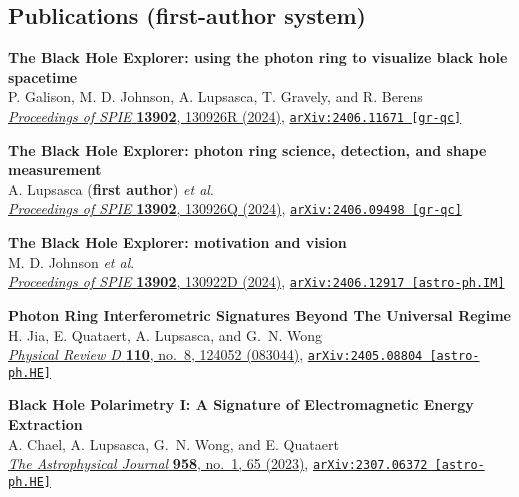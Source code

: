 \documentclass[margin,line]{resume}
\begin{document}
\begin{resume}

\clearpage

\section{\mysidestyle Publications (first-author system)}

\textbf{The Black Hole Explorer: using the photon ring to visualize black hole spacetime} \\
P. Galison, M. D. Johnson, A. Lupsasca, T. Gravely, and R. Berens \\
\href{https://doi.org/10.1117/12.3019994}{\textit{Proceedings of SPIE} \textbf{13902}, 130926R (2024)}, \texttt{\href{https://arxiv.org/abs/2406.11671}{arXiv:2406.11671 [gr-qc]}}

\textbf{The Black Hole Explorer: photon ring science, detection, and shape measurement} \\
A. Lupsasca (\textbf{first author}) \textit{et al}. \\
\href{https://doi.org/10.1117/12.3019437}{\textit{Proceedings of SPIE} \textbf{13902}, 130926Q (2024)}, \texttt{\href{https://arxiv.org/abs/2406.09498}{arXiv:2406.09498 [gr-qc]}}

\textbf{The Black Hole Explorer: motivation and vision} \\
M. D. Johnson \textit{et al}. \\
\href{https://doi.org/10.1117/12.3019835}{\textit{Proceedings of SPIE} \textbf{13902}, 130922D (2024)}, \texttt{\href{https://arxiv.org/abs/2406.12917}{arXiv:2406.12917 [astro-ph.IM]}}

\textbf{Photon Ring Interferometric Signatures Beyond The Universal Regime} \\
H. Jia, E. Quataert, A. Lupsasca, and G.~N. Wong \\
\href{https://doi.org/10.1103/PhysRevD.110.083044}{\textit{Physical Review D} \textbf{110}, no.~8, 124052 (083044)}, \texttt{\href{https://arxiv.org/abs/2405.08804}{arXiv:2405.08804 [astro-ph.HE]}}

\textbf{Black Hole Polarimetry I: A Signature of Electromagnetic Energy Extraction} \\
A. Chael, A. Lupsasca, G.~N. Wong, and E. Quataert \\
\href{https://doi.org/10.3847/1538-4357/acf92d}{\textit{The Astrophysical Journal} \textbf{958}, no.~1, 65 (2023)}, \texttt{\href{https://arxiv.org/abs/2307.06372}{arXiv:2307.06372 [astro-ph.HE]}}


\end{resume}
\end{document}
